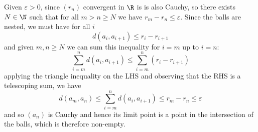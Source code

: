 \documentclass[a4paper,12pt,fleqn]{article}
\begin{document}
\begin{enumerate}[label=\arabic*.,leftmargin=*]
  Given \(\varepsilon > 0\), since \((r_n)\) convergent in \(\R\) is is also
  Cauchy, so there exists \(N \in \N\) such that for all \(m > n \geq N\) we have
  \(r_m - r_n \leq \varepsilon\).
  Since the balls are nested, we must have for all \(i\)
  \[d(a_i, a_{i+1}) \leq r_i - r_{i+1}\]
  and given \(m, n \geq N\) we can sum this inequality for \(i = m\) up to \(i = n\):
  \[\sum_{i=m}^n d(a_i, a_{i+1}) \leq \sum_{i=m}^n (r_i - r_{i+1})\]
  applying the triangle inequality on the LHS and observing that the RHS is a
  telescoping sum, we have
  \[d(a_m, a_n) \leq \sum_{i=m}^n d(a_i, a_{i+1}) \leq r_m - r_n \leq \varepsilon\]
  and so \((a_n)\) is Cauchy and hence its limit point is a point in the
  intersection of the balls, which is therefore non-empty.

\end{enumerate}
\end{document}
